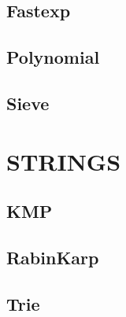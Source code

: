 \subsection{Fastexp}
\raggedbottom
\hrulefill
\subsection{Polynomial}
\raggedbottom
\hrulefill
\subsection{Sieve}
\raggedbottom
\hrulefill

\section{STRINGS}
\subsection{KMP}
\raggedbottom
\hrulefill
\subsection{RabinKarp}
\raggedbottom
\hrulefill
\subsection{Trie}
\raggedbottom
\hrulefill

